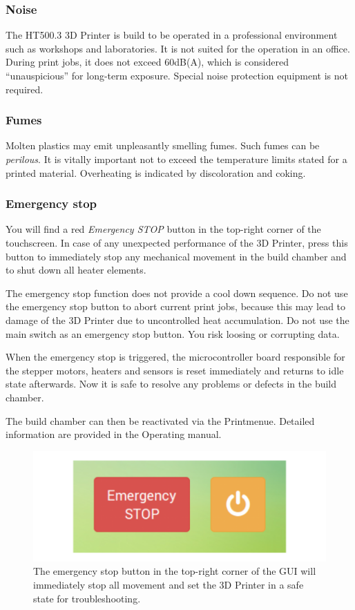 \subsubsection{Noise}

The HT500.3 3D Printer is build to be operated in a professional environment such as workshops and laboratories. It is not suited for the operation in an office. During print jobs, it does not exceed 60dB(A), which is considered “unauspicious” for long-term exposure.
Special noise protection equipment is not required.


\subsubsection{Fumes}

Molten plastics may emit unpleasantly smelling fumes. Such fumes can be \emph{perilous}.
It is vitally important not to exceed the temperature limits stated for a printed material. Overheating is indicated by discoloration and coking.


\subsubsection{Emergency stop}

You will find a red \emph{Emergency STOP} button in the top-right corner of the touchscreen. In case of any unexpected performance of the 3D Printer, press this button to immediately stop any mechanical movement in the build chamber and to shut down all heater elements.

\begin{notice}
  The emergency stop function does not provide a cool down sequence. Do not use the emergency stop button to abort current print jobs, because this may lead to damage of the 3D Printer due to uncontrolled heat accumulation.
  Do not use the main switch as an emergency stop button. You risk loosing or corrupting data. 
\end{notice}

When the emergency stop is triggered, the microcontroller board responsible for the stepper motors, heaters and sensors is reset immediately and returns to idle state afterwards. Now it is safe to resolve any problems or defects in the build chamber.

The build chamber can then be reactivated via the \lbrack Print\rbrack  menue.
Detailed information are provided in the Operating manual. 

\begin{figure}[H]
  \centering
  \includegraphics[width=.7\linewidth]{./img/gui_v110_emergencystop.png}
  \caption{The emergency stop button in the top-right corner of the GUI will immediately stop all movement and set the 3D Printer in a safe 
           state for troubleshooting.}
\end{figure}


